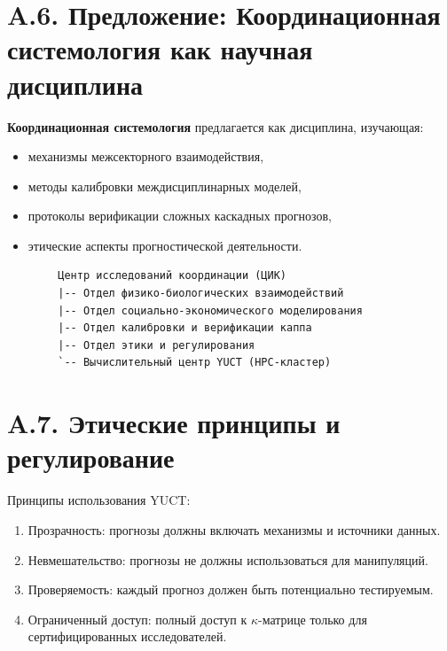 \documentclass[11pt,a4paper]{article}
\begin{document}
	\section*{A.6. Предложение: Координационная системология как научная дисциплина}
	
	\textbf{Координационная системология} предлагается как дисциплина, изучающая:
	\begin{itemize}[leftmargin=*]
		\item механизмы межсекторного взаимодействия,
		\item методы калибровки междисциплинарных моделей,
		\item протоколы верификации сложных каскадных прогнозов,
		\item этические аспекты прогностической деятельности.
	\end{itemize}
	
	\begin{lstlisting}
		Центр исследований координации (ЦИК)
		|-- Отдел физико-биологических взаимодействий
		|-- Отдел социально-экономического моделирования
		|-- Отдел калибровки и верификации каппа
		|-- Отдел этики и регулирования
		`-- Вычислительный центр YUCT (HPC-кластер)
	\end{lstlisting}
	
	\section*{A.7. Этические принципы и регулирование}
	
	Принципы использования YUCT:
	\begin{enumerate}[leftmargin=*]
		\item Прозрачность: прогнозы должны включать механизмы и источники данных.
		\item Невмешательство: прогнозы не должны использоваться для манипуляций.
		\item Проверяемость: каждый прогноз должен быть потенциально тестируемым.
		\item Ограниченный доступ: полный доступ к $\kappa$-матрице только для сертифицированных исследователей.
	\end{enumerate}
	
\end{document}
